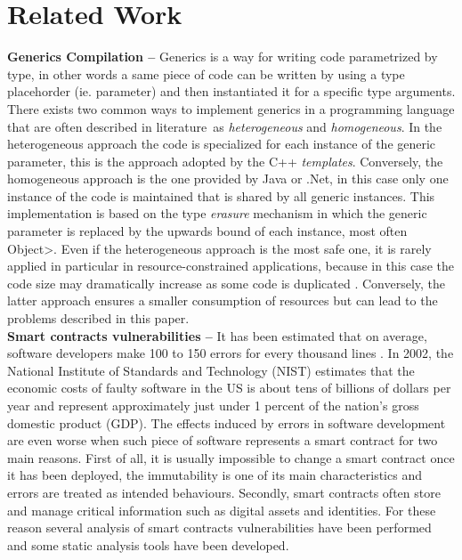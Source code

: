 \section{Related Work}\label{sec:related_work}



\textbf{Generics Compilation --} Generics is a way for writing code parametrized by type, in other words a same piece of code can be written by using a type placehorder (ie. parameter) and then instantiated it for a specific type arguments. There exists two common ways to implement generics in a programming language that are often described in literature\,\cite{generics_categories} as \textit{heterogeneous} and \textit{homogeneous}. In the heterogeneous approach the code is specialized for each instance of the generic parameter, this is the approach adopted by the C++ \emph{templates}. Conversely, the homogeneous approach is the one provided by Java or .Net, in this case only one instance of the code is maintained that is shared by all generic instances. This implementation is based on the type \emph{erasure} mechanism in which the generic parameter is replaced by the upwards bound of each instance, most often \<Object>.
%
Even if the heterogeneous approach is the most safe one, it is rarely applied in particular in resource-constrained applications, because in this case the code size  may dramatically increase as some code is duplicated \cite{generics_embedded_systems}. Conversely, the latter approach ensures a smaller consumption of resources but can lead to the problems described in this paper. \\

\noindent
\textbf{Smart contracts vulnerabilities --} It has been estimated that on average, software developers make 100 to 150 errors for every thousand lines \cite{software_engineering}.
In 2002, the National Institute of Standards and Technology (NIST) estimates that the economic costs of faulty software in the US is about tens of billions of dollars per year and represent approximately just under 1 percent of the nation's gross domestic product (GDP). The effects induced by errors in software development are even worse when such piece of software represents a smart contract for two main reasons. First of all, it is usually impossible to change a smart contract once it has been deployed, the immutability is one of its main characteristics and errors are treated as intended behaviours. Secondly, smart contracts often store and
manage critical information such as digital assets and identities. For these reason several analysis of smart contracts vulnerabilities have been performed and some static analysis tools have been developed.



